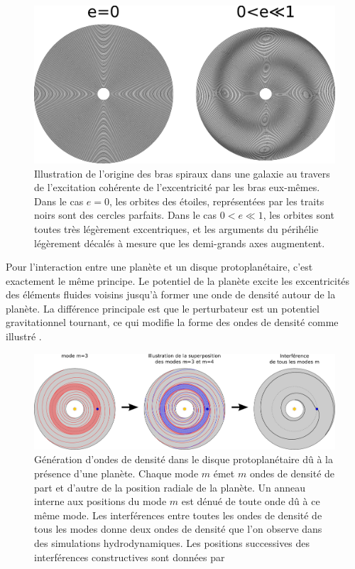 \begin{figure}[htbp]
\centering
\includegraphics[width=0.9\linewidth]{figure/spiral_arms.pdf}
\caption[Origine des bras spiraux dans une galaxie.]{Illustration de l'origine des bras spiraux dans une galaxie au travers de
l'excitation cohérente de l'excentricité par les bras eux-mêmes. Dans le cas \og $e=0$\fg, les orbites des étoiles, représentées
par les traits noirs sont des cercles parfaits. Dans le cas \og $0<e\ll 1$\fg, les orbites sont toutes très légèrement
excentriques, et les arguments du périhélie légèrement décalés à mesure que les demi-grands axes
augmentent.}\label{fig:spiral_arms}
\end{figure}

\bigskip

Pour l'interaction entre une planète et un disque protoplanétaire, c'est exactement le même principe. Le potentiel de la planète excite les excentricités des éléments fluides voisins jusqu'à former une onde de densité autour de la planète. La différence principale est que le perturbateur est un potentiel gravitationnel tournant, ce qui modifie la forme des ondes de densité comme illustré . 

\begin{figure}[htbp]
\centering
\includegraphics[width=\linewidth]{figure/lindblad_torque.pdf}
\caption[Construction de l'onde de densité due à la présence d'une planète.]{Génération d'ondes de densité dans le disque
protoplanétaire dû à la présence d'une planète. Chaque mode $m$ émet $m$ ondes de densité de part et d'autre de la position
radiale de la planète. Un anneau interne aux positions du mode $m$ est dénué de toute onde dû à ce même mode. Les interférences
entre toutes les ondes de densité de tous les modes donne deux ondes de densité que l'on observe dans des simulations
hydrodynamiques. Les positions successives des interférences constructives sont données par \cite[eq. (13) et
(24)]{ogilvie2002wake}}\label{fig:lindblad_torque}
\end{figure}


